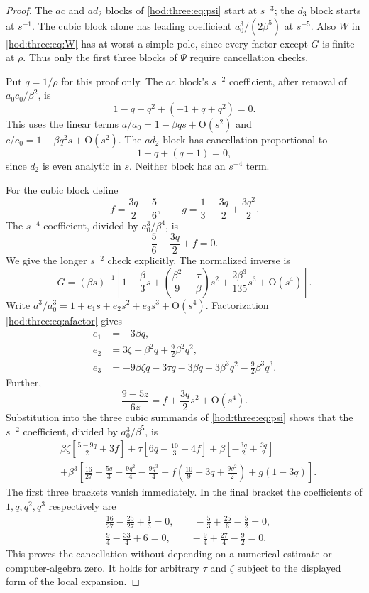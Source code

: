 \documentclass[11pt,letterpaper]{article}
\theoremstyle{definition}\newtheorem{definition}[theorem]{Definition}
\theoremstyle{remark}\newtheorem{remark}[theorem]{Remark}
\newcommand{\OO}{\mathrm O}
\begin{document}
\begin{proof}
The $ac$ and $ad_2$ blocks of \eqref{hod:three:eq:psi} start at $s^{-3}$; the $d_3$ block starts at $s^{-1}$. The cubic block alone has leading coefficient $a_0^3/(2\beta^5)$ at $s^{-5}$. Also $W$ in \eqref{hod:three:eq:W} has at worst a simple pole, since every factor except $G$ is finite at $\rho$. Thus only the first three blocks of $\Psi$ require cancellation checks.

Put $q=1/\rho$ for this proof only. The $ac$ block's $s^{-2}$ coefficient, after removal of $a_0c_0/\beta^2$, is
\[
1-q-q^2+(-1+q+q^2)=0.
\]
This uses the linear terms $a/a_0=1-\beta q s+\OO(s^2)$ and $c/c_0=1-\beta q^2s+\OO(s^2)$. The $ad_2$ block has cancellation proportional to
\[
1-q+(q-1)=0,
\]
since $d_2$ is even analytic in $s$. Neither block has an $s^{-4}$ term.

For the cubic block define
\[
f=\frac{3q}{2}-\frac56,\qquad g=\frac13-\frac{3q}{2}+\frac{3q^2}{2}.
\]
The $s^{-4}$ coefficient, divided by $a_0^3/\beta^4$, is
\[
\frac56-\frac{3q}{2}+f=0.
\]
We give the longer $s^{-2}$ check explicitly. The normalized inverse is
\[
G=(\beta s)^{-1}\left[1+\frac\beta3s+
\left(\frac{\beta^2}{9}-\frac\tau\beta\right)s^2+
\frac{2\beta^3}{135}s^3+\OO(s^4)\right].
\]
Write $a^3/a_0^3=1+e_1s+e_2s^2+e_3s^3+\OO(s^4)$. Factorization \eqref{hod:three:eq:afactor} gives
\begin{align*}
e_1&=-3\beta q,\\
e_2&=3\zeta+\beta^2q+\frac92\beta^2q^2,\\
e_3&=-9\beta\zeta q-3\tau q-3\beta q-3\beta^3q^2-\frac92\beta^3q^3.
\end{align*}
Further,
\[
\frac{9-5z}{6z}=f+\frac{3q}{2}s^2+\OO(s^4).
\]
Substitution into the three cubic summands of \eqref{hod:three:eq:psi} shows that the $s^{-2}$ coefficient, divided by $a_0^3/\beta^5$, is
\begin{equation}\label{hod:three:eq:cancelpoly}
\begin{split}
&\beta\zeta\left[\frac{5-9q}{2}+3f\right]
+\tau\left[6q-\frac{10}{3}-4f\right]
+\beta\left[-\frac{3q}{2}+\frac{3q}{2}\right]\\
&+\beta^3\left[\frac{16}{27}-\frac{5q}{3}+\frac{9q^2}{4}-\frac{9q^3}{4}
+f\left(\frac{10}{9}-3q+\frac{9q^2}{2}\right)+g(1-3q)\right].
\end{split}
\end{equation}
The first three brackets vanish immediately. In the final bracket the coefficients of $1,q,q^2,q^3$ respectively are
\begin{align*}
&\frac{16}{27}-\frac{25}{27}+\frac13=0,\qquad
-\frac53+\frac{25}{6}-\frac52=0,\\
&\frac94-\frac{33}{4}+6=0,\qquad
-\frac94+\frac{27}{4}-\frac92=0.
\end{align*}
This proves the cancellation without depending on a numerical estimate or computer-algebra zero. It holds for arbitrary $\tau$ and $\zeta$ subject to the displayed form of the local expansion.


\end{proof}
\end{document}
